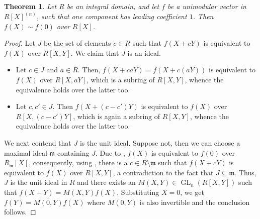 \documentclass[12pt]{article}
\theoremstyle{thmstyle}
\newtheorem{theorem}{Theorem}[section]
\theoremstyle{defstyle}
\newcommand{\GL}{\operatorname{GL}}
\newcommand{\frakm}{\mathfrak{m}} %
\begin{document}
\begin{theorem}
    Let $R$ be an integral domain, and let $f$ be a unimodular vector in $R[X]^{(n)}$, such that one component has leading coefficient $1$. Then $f(X)\sim f(0)$ over $R[X]$.
\end{theorem}
\begin{proof}
    Let $J$ be the set of elements $c\in R$ such that $f(X + cY)$ is equivalent to $f(X)$ over $R[X, Y]$. We claim that $J$ is an ideal. 
    \begin{itemize}
        \item Let $c\in J$ and $a\in R$. Then, $f(X + caY) = f(X + c(aY))$ is equivalent to $f(X)$ over $R[X, aY]$, which is a subring of $R[X, Y]$, whence the equivalence holds over the latter too. 
        \item Let $c, c'\in J$. Then $f(X + (c - c')Y)$ is equivalent to $f(X)$ over $R[X, (c - c')Y]$, which is again a subring of $R[X,Y]$, whence the equivalence holds over the latter too.
    \end{itemize}
    We next contend that $J$ is the unit ideal. Suppose not, then we can choose a maximal ideal $\frakm$ containing $J$. Due to , $f(X)$ is equivalent to $f(0)$ over $R_\frakm[X]$, consequently, using , there is a $c\in R\setminus\frakm$ such that $f(X + cY)$ is equivalent to $f(X)$ over $R[X, Y]$, a contradiction to the fact that $J\subseteq\frakm$. Thus, $J$ is the unit ideal in $R$ and there exists an $M(X, Y)\in\GL_n(R[X, Y])$ such that $f(X + Y) = M(X, Y)f(X)$. Substituting $X = 0$, we get $f(Y) = M(0, Y)f(X)$ where $M(0, Y)$ is also invertible and the conclusion follows.
\end{proof}
\end{document}
